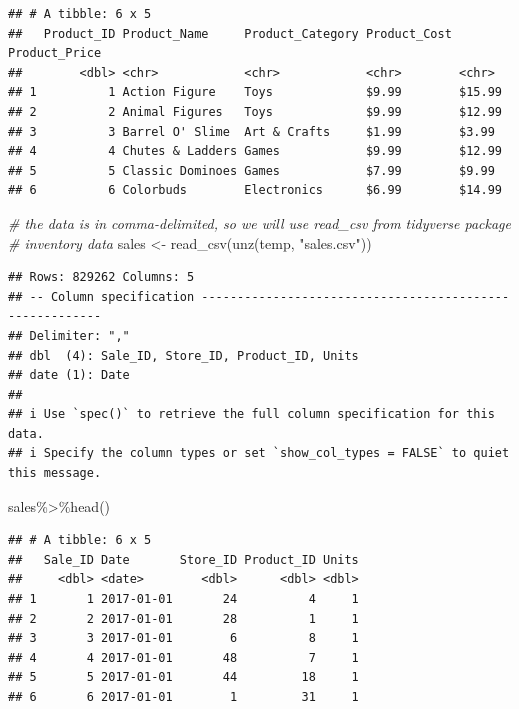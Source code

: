 \documentclass[
]{book}
\newenvironment{Shaded}{\begin{snugshade}}{\end{snugshade}}
\newcommand{\CommentTok}[1]{\textcolor[rgb]{0.56,0.35,0.01}{\textit{#1}}}
\newcommand{\FunctionTok}[1]{\textcolor[rgb]{0.00,0.00,0.00}{#1}}
\newcommand{\NormalTok}[1]{#1}
\newcommand{\OtherTok}[1]{\textcolor[rgb]{0.56,0.35,0.01}{#1}}
\newcommand{\SpecialCharTok}[1]{\textcolor[rgb]{0.00,0.00,0.00}{#1}}
\newcommand{\StringTok}[1]{\textcolor[rgb]{0.31,0.60,0.02}{#1}}
\begin{document}
\begin{verbatim}
## # A tibble: 6 x 5
##   Product_ID Product_Name     Product_Category Product_Cost Product_Price
##        <dbl> <chr>            <chr>            <chr>        <chr>        
## 1          1 Action Figure    Toys             $9.99        $15.99       
## 2          2 Animal Figures   Toys             $9.99        $12.99       
## 3          3 Barrel O' Slime  Art & Crafts     $1.99        $3.99        
## 4          4 Chutes & Ladders Games            $9.99        $12.99       
## 5          5 Classic Dominoes Games            $7.99        $9.99        
## 6          6 Colorbuds        Electronics      $6.99        $14.99
\end{verbatim}

\begin{Shaded}
\begin{Highlighting}[]
\CommentTok{\# the data is in comma{-}delimited, so we will use \textasciigrave{}read\_csv\textasciigrave{} from \textasciigrave{}tidyverse\textasciigrave{} package}
\CommentTok{\# inventory data}
\NormalTok{sales }\OtherTok{\textless{}{-}} \FunctionTok{read\_csv}\NormalTok{(}\FunctionTok{unz}\NormalTok{(temp, }\StringTok{"sales.csv"}\NormalTok{))}
\end{Highlighting}
\end{Shaded}

\begin{verbatim}
## Rows: 829262 Columns: 5
## -- Column specification --------------------------------------------------------
## Delimiter: ","
## dbl  (4): Sale_ID, Store_ID, Product_ID, Units
## date (1): Date
## 
## i Use `spec()` to retrieve the full column specification for this data.
## i Specify the column types or set `show_col_types = FALSE` to quiet this message.
\end{verbatim}

\begin{Shaded}
\begin{Highlighting}[]
\NormalTok{sales}\SpecialCharTok{\%\textgreater{}\%}\FunctionTok{head}\NormalTok{()}
\end{Highlighting}
\end{Shaded}

\begin{verbatim}
## # A tibble: 6 x 5
##   Sale_ID Date       Store_ID Product_ID Units
##     <dbl> <date>        <dbl>      <dbl> <dbl>
## 1       1 2017-01-01       24          4     1
## 2       2 2017-01-01       28          1     1
## 3       3 2017-01-01        6          8     1
## 4       4 2017-01-01       48          7     1
## 5       5 2017-01-01       44         18     1
## 6       6 2017-01-01        1         31     1
\end{verbatim}
\end{document}
